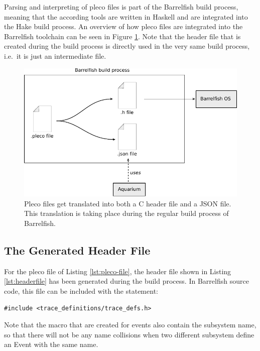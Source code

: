 \documentclass[a4paper,11pt,twoside]{report}
\begin{document}
Parsing and interpreting of pleco files is part of the Barrelfish build process,
meaning that the according tools are written in Haskell and are integrated into
the Hake build process.  An overview of how pleco files are integrated into the
Barrelfish toolchain can be seen in Figure \ref{fig:pleco-process}. Note that
the header file that is created during the build process is directly used in the
very same build process, i.e.~it is just an intermediate file.

\begin{figure}[t]
	\begin{center}
		\includegraphics{images/pleco-process.pdf}
	\end{center}
	\caption{Pleco files get translated into both a C header file and a JSON
	file. This translation is taking place during the regular build process of
Barrelfish.}
	\label{fig:pleco-process}
\end{figure}

\subsection{The Generated Header File}

For the pleco file of Listing \ref{lst:pleco-file}, the header file shown in
Listing \ref{lst:headerfile} has been generated during the build process. In
Barrelfish source code, this file can be included with the statement:

\begin{lstlisting}
#include <trace_definitions/trace_defs.h>
\end{lstlisting}

Note that the macro that are created for events also contain the subsystem name,
so that there will not be any name collisions when two different subsystem
define an Event with the same name.
\end{document}
